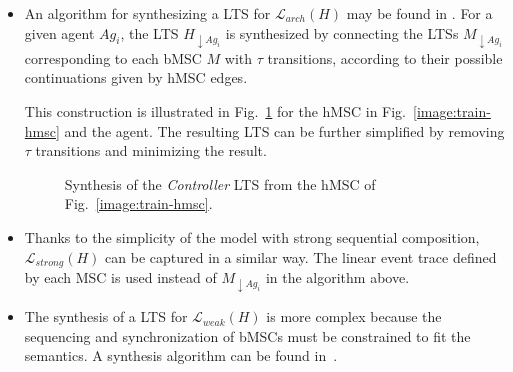 \begin{itemize}
\item An algorithm for synthesizing a LTS for $\mathcal{L}_{arch}(H)$ may be found in \cite{Uchitel:2003}. For a given agent $Ag_{i}$, the LTS $H_{\downarrow Ag_i}$ is synthesized by connecting the LTSs $M_{\downarrow Ag_i}$ corresponding to each bMSC $M$ with $\tau$ transitions, according to their possible continuations given by hMSC edges. 

This construction is illustrated in Fig.~\ref{image:train-controller-synthesis} for the hMSC in Fig.~\ref{image:train-hmsc} and the  agent. The resulting LTS can be further simplified by removing $\tau$ transitions and minimizing the result.
\vspace{0.4cm}
\begin{figure}[H]\centering
{}
\caption{Synthesis of the \emph{Controller} LTS from the hMSC of Fig.~\ref{image:train-hmsc}.\label{image:train-controller-synthesis}}
\end{figure}

\item Thanks to the simplicity of the model with strong sequential composition, $\mathcal{L}_{strong}(H)$ can be captured in a similar way. The linear event trace defined by each MSC is used instead of $M_{\downarrow Ag_i}$ in the algorithm above.

\item The synthesis of a LTS for $\mathcal{L}_{weak}(H)$ is more complex because the sequencing and synchronization of bMSCs must be constrained to fit the semantics. A synthesis algorithm can be found in~\cite{Uchitel:2004}.
\end{itemize}

